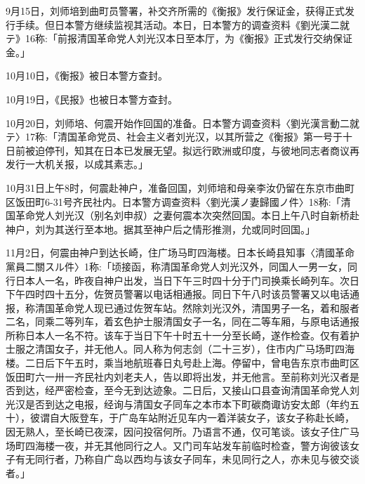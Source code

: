 9月15日，刘师培到曲町员警署，补交齐所需的《衡报》发行保证金，获得正式发行手续。但日本警方继续监视其活动。本日，日本警方的调查资料《劉光漢二就テ》16称:「前报清国革命党人刘光汉本日至本厅，为《衡报》正式发行交纳保证金。」

10月10日，《衡报》被日本警方查封。

10月19日，《民报》也被日本警方查封。

10月20日，刘师培、何震开始作回国的准备。日本警方调查资料〈劉光漢言動二就テ〉17称:「清国革命党员、社会主义者刘光汉，以其所营之《衡报》第一号于十日前被迫停刊，知其在日本已发展无望。拟远行欧洲或印度，与彼地同志者商议再发行一大机关报，以成其素志。」

\vfill
\begin{BookNotes}
\end{BookNotes}

10月31日上午8时，何震赴神户，准备回国，刘师培和母亲李汝仍留在东京市曲町区饭田町6-31号齐民社内。日本警方调查资料〈劉光漢ノ妻歸國ノ件〉18称:「清国革命党人刘光汉（别名刘申叔）之妻何震本次突然回国。本日上午八时自新桥赴神户，刘为其送行至本地。据其至神户后之情形推测，允或同时回国。」

11月2日，何震由神户到达长崎，住广场马町四海楼。日本长崎县知事〈清國革命黨員二關スル件〉1称:「顷接函，称清国革命党人刘光汉外，同国人一男一女，同行日本人一名，昨夜自神户出发，当日下午三时四十分于门司换乘长崎列车。次日下午四时四十五分，佐贺员警署以电话相通报。同日下午八时该员警署又以电话通报，称清国革命党人现已通过佐贺车站。然除刘光汉外，清国男子一名，着和服者二名，同乘二等列车，着玄色护士服清国女子一名，同在二等车厢，与原电话通报所称日本人一名不符。该车于当日下午十时五十一分至长崎，遂作检查。仅有着护士服之清国女子，并无他人。同人称为何志剑（二十三岁），住市内广马场町四海楼。二日后下午五时，乘当地航班春日丸号赴上海。停留中，曾电告东京市曲町区饭田町六一卅一齐民社内刘老夫人，告以即将出发，并无他言。至前称刘光汉者是否到达，经严密检查，至今无到达迹象。二日后，又接山口县查询清国革命党人刘光汉是否到达之电报，经询与清国女子同车之本市本下町碳商诹访安太郎（年约五十），彼谓自大阪登车，于广岛车站附近见车内一着洋装女子，该女子称赴长崎，因无熟人，至长崎已夜深，因问投宿何所。乃语言不通，仅可笔谈。该女子住广马场町四海楼一夜，并无其他同行之人。又门司车站发车前临时检查，警方询彼该女子有无同行者，乃称自广岛以西均与该女子同车，未见同行之人，亦未见与彼交谈者。」

